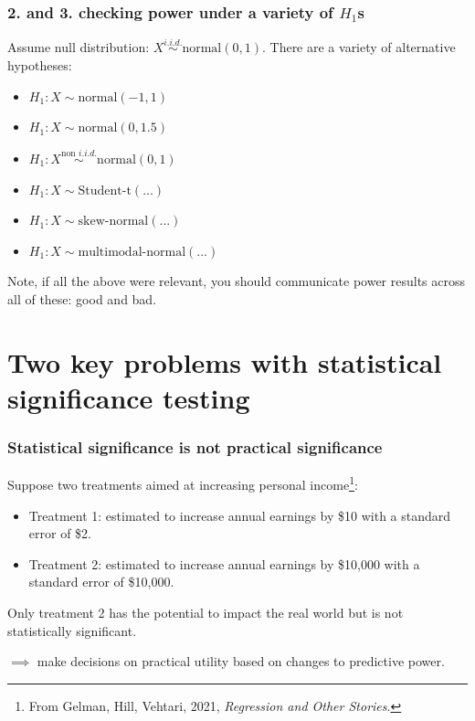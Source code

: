 \documentclass[handout]{beamer}
\begin{document}
\begin{frame}
	\frametitle{2. and 3. checking power under a variety of $H_1$s}
	
	Assume null distribution: $X \stackrel{i.i.d.}{\sim} \text{normal}(0, 1)$. There are a variety of alternative hypotheses:
	
	\begin{itemize}
		\item $H_1: X \sim \text{normal}(-1, 1)$
		\item $H_1: X \sim \text{normal}(0, 1.5)$
		\item $H_1: X \stackrel{\text{non } i.i.d.}{\sim} \text{normal}(0, 1)$
		\item $H_1: X\sim \text{Student-t}(...)$
		\item $H_1: X \sim \text{skew-normal}(...)$
		\item $H_1: X \sim \text{multimodal-normal}(...)$
	\end{itemize}
	
	Note, if all the above were relevant, you should communicate power results across all of these: good and bad.
	
\end{frame}

\section{Two key problems with statistical significance testing}
\frame{\tableofcontents[currentsection]}

\begin{frame}
	\frametitle{Statistical significance is not practical significance}
	
	Suppose two treatments aimed at increasing personal income\footnote{From Gelman, Hill, Vehtari, 2021, \textit{Regression and Other Stories}.}:
	
	\begin{itemize}
		\item Treatment 1: estimated to increase annual earnings by \$10 with a standard error of \$2.
		\item Treatment 2: estimated to increase annual earnings by \$10,000 with a standard error of \$10,000.
	\end{itemize}
	
	Only treatment 2 has the potential to impact the real world but is not statistically significant.
	
	$\implies$ make decisions on practical utility based on changes to predictive power.
	
\end{frame}
\end{document}
